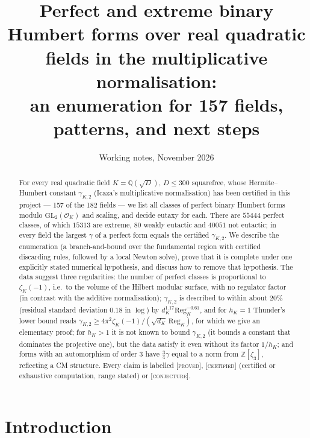 \documentclass[11pt]{amsart}
\title[Perfect binary Humbert forms, multiplicative normalisation]{Perfect and extreme binary Humbert forms over real quadratic fields
in the multiplicative normalisation:\\ an enumeration for 157 fields, patterns, and next steps}
\date{Working notes, November 2026}
\theoremstyle{definition}
\theoremstyle{remark}
\newcommand{\Q}{\mathbb{Q}}
\newcommand{\Z}{\mathbb{Z}}
\newcommand{\OK}{\mathcal{O}_K}
\newcommand{\GL}{\mathrm{GL}}
\newcommand{\Reg}{\mathrm{Reg}_K}
\newcommand{\gK}{\gamma_{K,2}}
\newcommand{\PROVED}{\textsc{[proved]}}
\newcommand{\CERT}{\textsc{[certified]}}
\newcommand{\CONJ}{\textsc{[conjecture]}}
\begin{document}
\begin{abstract}
For every real quadratic field $K=\Q(\sqrt D)$, $D\le 300$ squarefree, whose Hermite--Humbert
constant $\gK$ (Icaza's multiplicative normalisation) has been certified in this project ---
157 of the 182 fields --- we list all classes of perfect binary Humbert forms modulo
$\GL_2(\OK)$ and scaling, and decide eutaxy for each.  There are $55444$ perfect classes, of
which $15313$ are extreme, $80$ weakly eutactic and $40051$ not eutactic; in every field the
largest $\gamma$ of a perfect form equals the certified $\gK$.  We describe the enumeration
(a branch-and-bound over the fundamental region with certified discarding rules, followed by
a local Newton solve), prove that it is complete under one explicitly stated numerical
hypothesis, and discuss how to remove that hypothesis.  The data suggest three regularities:
the number of perfect classes is proportional to $\zeta_K(-1)$, i.e.\ to the volume of the
Hilbert modular surface, with no regulator factor (in contrast with the additive
normalisation); $\gK$ is described to within about $20\%$ (residual standard deviation $0.18$ in $\log$) by $d_K^{1.17}\Reg^{-0.61}$, and
for $h_K=1$ Thunder's lower bound reads $\gK\ge 4\pi^2\zeta_K(-1)/(\sqrt{d_K}\,\Reg)$, for
which we give an elementary proof; for $h_K>1$ it is not known to bound $\gK$ (it bounds a
constant that dominates the projective one), but the data satisfy it even without its
factor $1/h_K$; and forms
with an automorphism of order $3$ have $\tfrac34\gamma$ equal to a norm from $\Z[\zeta_3]$,
reflecting a CM structure.  Every claim is labelled \PROVED, \CERT{} (certified or exhaustive
computation, range stated) or \CONJ.
\end{abstract}

\maketitle
\tableofcontents

\section{Introduction}\label{sec:intro}
\end{document}
